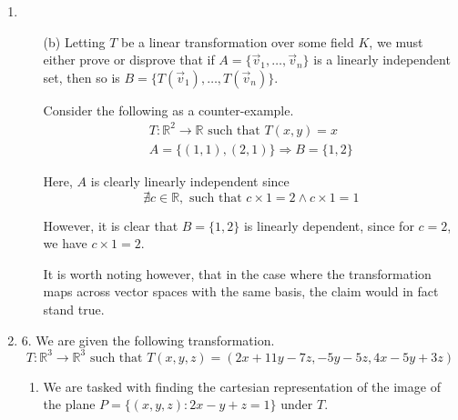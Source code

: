 \documentclass{article}
\newenvironment{answers}{ %
	\begin{enumerate}
		\setlength{\itemsep}{\bigskipamount}
}{\end{enumerate}}
\newcommand{\R}{\mathbb{R}}
\newcommand{\st}{\text{ such that }}
\begin{document}
\begin{answers}
\begin{enumerate}
				By applying the transformation to each \((x,y)\), it simply makes \(x\) into \(y\) and vice versa. Therefore the images \(L'_1\) and \(L'_2\) of \(L_1\) and \(L_2\) respectively are the following.
				\begin{gather*}
					L'_1 = \{(x,y) : x - y = 0\} \\
					L'_2 = \{(x,y) : y + 3x = 0\}
				\end{gather*}
		\end{enumerate}

	\item
		\begin{enumerate}
			\item[(b)]
				Letting \(T\) be a linear transformation over some field \(K\), we must either prove or disprove that if \(A = \{\vec{v}_1,\dots,\vec{v}_n\}\) is a linearly independent set, then so is \(B = \{T(\vec{v}_1),\dots,T(\vec{v}_n)\}\).

				Consider the following as a counter-example.
				\begin{gather*}
					T: \R^2 \to \R \st T(x, y) = x \\
					A = \{(1, 1), (2, 1)\} \Rightarrow B = \{1, 2\}
				\end{gather*}

				Here, \(A\) is clearly linearly independent since
				\begin{equation*}
					\nexists c \in \R,\st c \times 1 = 2 \land c \times 1 = 1
				\end{equation*}

				However, it is clear that \(B = \{1, 2\}\) is linearly dependent, since for \(c = 2\), we have \(c \times 1 = 2\).

				It is worth noting however, that in the case where the transformation maps across vector spaces with the same basis, the claim would in fact stand true.
		\end{enumerate}

	\item[6.]
		We are given the following transformation.
		\begin{equation*}
			T: \R^3 \to \R^3 \st T(x, y, z) = (2x + 11y - 7z, -5y - 5z, 4x - 5y + 3z)
		\end{equation*}
		\begin{enumerate}
			\item
				We are tasked with finding the cartesian representation of the image of the plane \(P = \{(x,y,z):2x-y+z=1\}\) under \(T\).


\end{enumerate}
\end{answers}
\end{document}

